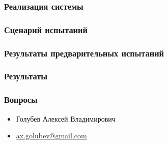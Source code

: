 \begin{frame}
    \frametitle{Реализация системы}
\end{frame}

\begin{frame}
    \frametitle{Сценарий испытаний}
\end{frame}

\begin{frame}
    \frametitle{Результаты предварительных испытаний}
\end{frame}

\begin{frame}
    \frametitle{Результаты}
\end{frame}

\begin{frame}
    \frametitle{Вопросы}
    \begin{itemize}
        \item Голубев Алексей Владимирович
        \item \href{mailto:ax.golubev@gmail.com}{ax.golubev@gmail.com}
    \end{itemize}
\end{frame}
